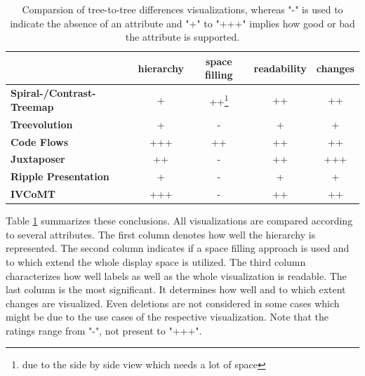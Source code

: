 \begin{table}[tb]
\centering 
\begin{tabular}[r]{|l|c|c|c|c|} 
\hline
& \textbf{hierarchy} & \textbf{space filling} & \textbf{readability} & \textbf{changes}\\
\hline
\hline
\textbf{Spiral-/Contrast-Treemap} & + & ++\footnote{due to the side by side view which needs a lot of space} & ++ & ++\\
\hline
\textbf{Treevolution} & + & - & + & +\\
\hline
\textbf{Code Flows} & +++ & ++ & ++ & ++\\
\hline
\textbf{Juxtaposer} & ++ & - & ++ & +++\\
\hline
\textbf{Ripple Presentation} & + & - & + & +\\
\hline
\textbf{IVCoMT} & +++ & - & ++ & ++ \\
\hline
\end{tabular}
\label{chap2:comparsion}
\vspace{0.5em} 
\caption{Comparsion of tree-to-tree differences visualizations, whereas "-" is used to indicate the absence of an attribute and "+" to "+++" implies how good or bad the attribute is supported.}
\end{table}

Table \ref{chap2:comparsion} summarizes these conclusions. All visualizations are compared according to several attributes. The first column denotes how well the hierarchy is represented. The second column indicates if a space filling approach is used and to which extend the whole display space is utilized. The third column characterizes how well labels as well as the whole visualization is readable. The last column is the most significant. It determines how well and to which extent changes are visualized. Even deletions are not considered in some cases which might be due to the use cases of the respective visualization. Note that the ratings range from "-", not present to "+++".






